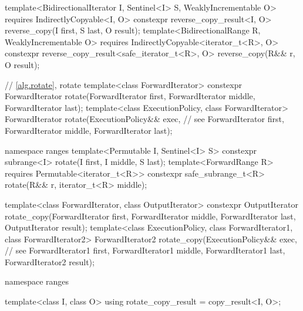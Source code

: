 \begin{addedblock}
\begin{codeblock}
{    template<BidirectionalIterator I, Sentinel<I> S, WeaklyIncrementable O>
      requires IndirectlyCopyable<I, O>
      constexpr reverse_copy_result<I, O>
        reverse_copy(I first, S last, O result);
    template<BidirectionalRange R, WeaklyIncrementable O>
      requires IndirectlyCopyable<iterator_t<R>, O>
      constexpr reverse_copy_result<safe_iterator_t<R>, O>
        reverse_copy(R&& r, O result);
  }
\end{codeblock}\end{addedblock}\begin{codeblock}

  // \ref{alg.rotate}, rotate
  template<class ForwardIterator>
    constexpr ForwardIterator rotate(ForwardIterator first,
                                     ForwardIterator middle,
                                     ForwardIterator last);
  template<class ExecutionPolicy, class ForwardIterator>
    ForwardIterator rotate(ExecutionPolicy&& exec, // see 
                           ForwardIterator first,
                           ForwardIterator middle,
                           ForwardIterator last);
\end{codeblock}\begin{addedblock}\begin{codeblock}
  namespace ranges {
    template<Permutable I, Sentinel<I> S>
      constexpr subrange<I> rotate(I first, I middle, S last);
    template<ForwardRange R>
      requires Permutable<iterator_t<R>>
      constexpr safe_subrange_t<R> rotate(R&& r, iterator_t<R> middle);
  }
\end{codeblock}\end{addedblock}\begin{codeblock}
  template<class ForwardIterator, class OutputIterator>
    constexpr OutputIterator
      rotate_copy(ForwardIterator first, ForwardIterator middle,
                  ForwardIterator last, OutputIterator result);
  template<class ExecutionPolicy, class ForwardIterator1, class ForwardIterator2>
    ForwardIterator2
      rotate_copy(ExecutionPolicy&& exec, // see 
                  ForwardIterator1 first, ForwardIterator1 middle,
                  ForwardIterator1 last, ForwardIterator2 result);
\end{codeblock}\begin{addedblock}\begin{codeblock}
  namespace ranges {
    template<class I, class O>
    using rotate_copy_result = copy_result<I, O>;

}
\end{codeblock}
\end{addedblock}
